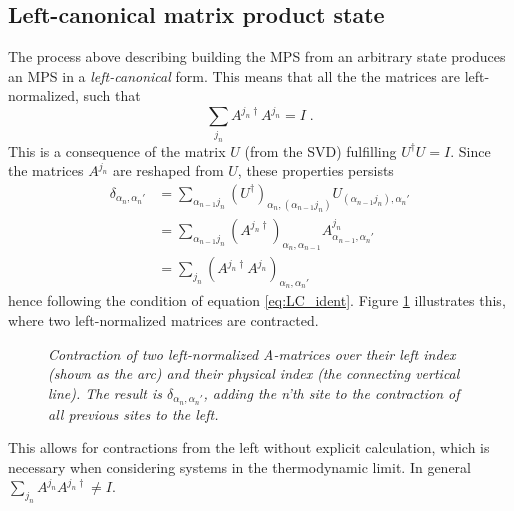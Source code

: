 \subsection{Left-canonical matrix product state}
The process above describing building the MPS from an arbitrary state produces an MPS in a \textit{left-canonical} form. This means that all the the matrices are left-normalized, such that
\begin{equation}
	\sum_{j_n} A^{j_n \dag} A^{j_n} = I \; .
	\label{eq:LC_ident}
\end{equation}
This is a consequence of the matrix $U$ (from the SVD) fulfilling $U^{\dag}U = I$. Since the matrices $A^{j_n}$ are reshaped from $U$, these properties persists
\begin{align*}
	\delta_{\alpha_n , \alpha_n'} &= \sum_{\alpha_{n-1} j_n} (U^{\dag})_{\alpha_n , (\alpha_{n-1} j_n)} U_{(\alpha_{n-1} j_n), \alpha_n'} \\
	 &= \sum_{\alpha_{n-1} j_n} (A^{j_n \dag})_{\alpha_n , \alpha_{n-1}} A_{\alpha_{n-1}, \alpha_n'}^{j_n} \\
	 &= \sum_{j_n} \left( A^{j_n \dag} A^{j_n} \right)_{\alpha_{n}, \alpha_n'}
\end{align*} 
hence following the condition of equation \ref{eq:LC_ident}. Figure \ref{fig:leftNorm} illustrates this, where two left-normalized matrices are contracted.
\begin{figure}[h!]
	\centering
	
	\caption{\textit{Contraction of two left-normalized A-matrices over their left index (shown as the arc) and their physical index (the connecting vertical line). The result is $\delta_{\alpha_n , \alpha_n'}$, adding the n'th site to the contraction of all previous sites to the left.}}
	\label{fig:leftNorm}
\end{figure}
This allows for contractions from the left without explicit calculation, which is necessary when considering systems in the thermodynamic limit. In general $\sum_{j_n} A^{j_n} A^{j_n \dag}  \neq I$.

